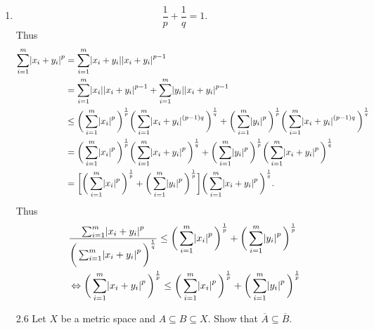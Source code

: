 \documentclass[12pt]{article}
\makeatletter
\theoremstyle{definition}
\theoremstyle{remark}
\renewenvironment{proof}[1][\proofname]{\par
  \pushQED{\qed}%
  \normalfont \topsep6\p@\@plus6\p@\relax
  \list{}{\leftmargin=0mm
          \rightmargin=4mm
          \settowidth{\itemindent}{\itshape#1}%
          \labelwidth=\itemindent
          \parsep=0pt \listparindent=\parindent 
  }
  \item[\hskip\labelsep
        \itshape
    #1\@addpunct{.}]\ignorespaces
}{%
  \popQED\endlist\@endpefalse
}
\let\oldproofname=\proofname
\renewcommand{\proofname}{\bf{\textit{\oldproofname}}}
\makeatother
\begin{document}
\begin{enumerate}[leftmargin=*]
\begin{proof}
                    \begin{equation*}
                        \frac{1}{p}+\frac{1}{q}=1.
                    \end{equation*}
                Thus
                    \begin{equation*}
                        \begin{split}
                            \sum_{i=1}^{m}\abs{x_i+y_i}^p &= \sum_{i=1}^{m}\abs{x_i+y_i}\abs{x_i+y_i}^{p-1} \\
                            &= \sum_{i=1}^{m}\abs{x_i}\abs{x_i+y_i}^{p-1}+\sum_{i=1}^{m}\abs{y_i}\abs{x_i+y_i}^{p-1} \\
                            &\leq\bigg(\sum_{i=1}^{m}\abs{x_i}^p\bigg)^{\frac{1}{p}}\bigg(\sum_{i=1}^{m}\abs{x_i+y_i}^{(p-1)q}\bigg)^{\frac{1}{q}}+\bigg(\sum_{i=1}^{m}\abs{y_i}^p\bigg)^{\frac{1}{p}}\bigg(\sum_{i=1}^{m}\abs{x_i+y_i}^{(p-1)q}\bigg)^{\frac{1}{q}} \\
                            &= \bigg(\sum_{i=1}^{m}\abs{x_i}^p\bigg)^{\frac{1}{p}}\bigg(\sum_{i=1}^{m}\abs{x_i+y_i}^{p}\bigg)^{\frac{1}{q}}+\bigg(\sum_{i=1}^{m}\abs{y_i}^p\bigg)^{\frac{1}{p}}\bigg(\sum_{i=1}^{m}\abs{x_i+y_i}^{p}\bigg)^{\frac{1}{q}} \\
                            &= \bigg[\bigg(\sum_{i=1}^{m}\abs{x_i}^p\bigg)^{\frac{1}{p}}+\bigg(\sum_{i=1}^{m}\abs{y_i}^p\bigg)^\frac{1}{p}\bigg]\bigg(\sum_{i=1}^{m}\abs{x_i+y_i}^p\bigg)^{\frac{1}{q}}.
                        \end{split}
                    \end{equation*}
                    Thus
                        \begin{equation*}
                            \begin{split}
                                &\frac{\sum_{i=1}^{m}\abs{x_i+y_i}^p}{\bigg(\sum_{i=1}^{m}\abs{x_i+y_i}^p \bigg)^{\frac{1}{q}}} \leq \bigg(\sum_{i=1}^{m}\abs{x_i}^p\bigg)^{\frac{1}{p}}+\bigg(\sum_{i=1}^{m}\abs{y_i}^p\bigg)^\frac{1}{p} \\
                                &\Leftrightarrow \bigg(\sum_{i=1}^{m}\abs{x_i+y_i}^p\bigg)^{\frac{1}{p}}\leq \bigg(\sum_{i=1}^{m}\abs{x_i}^p\bigg)^{\frac{1}{p}}+\bigg(\sum_{i=1}^{m}\abs{y_i}^p\bigg)^{\frac{1}{p}}
                            \end{split}
                        \end{equation*}
                \end{proof}
            \item[2.6] Let $X$ be a metric space and $A\subseteq B\subseteq X$. Show that $\overline{A}\subseteq\overline{B}$.

\end{enumerate}
\end{document}
